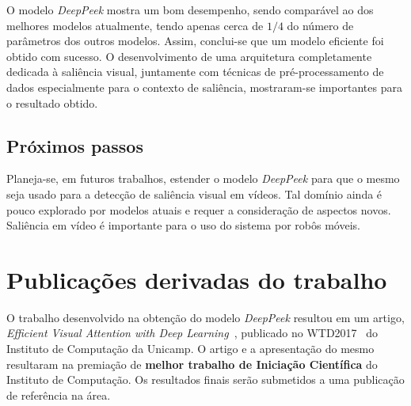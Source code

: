 \documentclass[11pt]{article}
\newcommand{\tit}[1]{\textit{#1}}
\newcommand{\tbf}[1]{\textbf{#1}}
\begin{document}
O modelo \tit{DeepPeek} mostra um bom desempenho, sendo comparável
ao dos melhores modelos atualmente, tendo apenas cerca de $1/4$ do número
de parâmetros dos outros modelos.
Assim, conclui-se que um modelo eficiente foi obtido com sucesso.
O desenvolvimento de uma arquitetura completamente dedicada à saliência visual,
juntamente com técnicas de pré-processamento de dados especialmente para
o contexto de saliência, mostraram-se importantes para o resultado obtido.

\subsection{Próximos passos}
Planeja-se, em futuros trabalhos, estender o modelo \tit{DeepPeek} para
que o mesmo seja usado para a detecção de saliência visual em vídeos.
Tal domínio ainda é pouco explorado por modelos atuais e requer a consideração
de aspectos novos.
Saliência em vídeo é importante para o uso do sistema por robôs móveis.

\section{Publicações derivadas do trabalho}
O trabalho desenvolvido na obtenção do modelo \tit{DeepPeek} resultou em um
artigo, \tit{Efficient Visual Attention with Deep Learning}~\cite{myarticle},
publicado no WTD2017~\cite{wtd2017} do Instituto de Computação da Unicamp.
O artigo e a apresentação do mesmo resultaram na premiação de
\tbf{melhor trabalho de Iniciação Científica} do Instituto de Computação. Os resultados finais serão submetidos a uma publicação de referência na área.

\printbibliography

\end{document}

